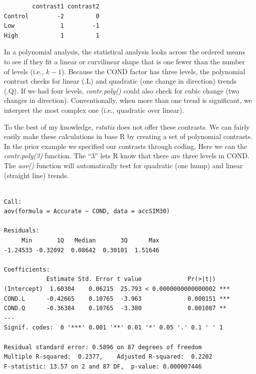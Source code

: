 \documentclass[
  11pt,
]{book}
\newenvironment{Shaded}{\begin{snugshade}}{\end{snugshade}}
\newcommand{\AttributeTok}[1]{\textcolor[rgb]{0.27,0.27,0.27}{#1}}
\newcommand{\DecValTok}[1]{\textcolor[rgb]{0.06,0.06,0.06}{#1}}
\newcommand{\FunctionTok}[1]{\textcolor[rgb]{0.27,0.27,0.27}{\textbf{#1}}}
\newcommand{\NormalTok}[1]{#1}
\newcommand{\OtherTok}[1]{\textcolor[rgb]{0.37,0.37,0.37}{#1}}
\newcommand{\SpecialCharTok}[1]{\textcolor[rgb]{0.43,0.43,0.43}{\textbf{#1}}}
\begin{document}
\begin{verbatim}
        contrast1 contrast2
Control        -2         0
Low             1        -1
High            1         1
\end{verbatim}

In a polynomial analysis, the statistical analysis looks across the ordered means to see if they fit a linear or curvilinear shape that is one fewer than the number of levels (i.e., \(k-1\)). Because the COND factor has three levels, the polynomial contrast checks for linear (.L) and quadratic (one change in direction) trends (.Q). If we had four levels, \emph{contr.poly()} could also check for cubic change (two changes in direction). Conventionally, when more than one trend is significant, we interpret the most complex one (i.e., quadratic over linear).

To the best of my knowledge, \emph{rstatix} does not offer these contrasts. We can fairly easily make these calculations in base R by creating a set of polynomial contrasts. In the prior example we specified our contrasts through coding. Here we can the \emph{contr.poly(3)} function. The ``3'' lets R know that there are three levels in COND. The \emph{aov()} function will automatically test for quadratic (one hump) and linear (straight line) trends.

\begin{Shaded}
\end{Shaded}

\begin{verbatim}

Call:
aov(formula = Accurate ~ COND, data = accSIM30)

Residuals:
     Min       1Q   Median       3Q      Max 
-1.24533 -0.32092  0.08642  0.30101  1.51646 

Coefficients:
            Estimate Std. Error t value             Pr(>|t|)    
(Intercept)  1.60304    0.06215  25.793 < 0.0000000000000002 ***
COND.L      -0.42665    0.10765  -3.963             0.000151 ***
COND.Q      -0.36384    0.10765  -3.380             0.001087 ** 
---
Signif. codes:  0 '***' 0.001 '**' 0.01 '*' 0.05 '.' 0.1 ' ' 1

Residual standard error: 0.5896 on 87 degrees of freedom
Multiple R-squared:  0.2377,    Adjusted R-squared:  0.2202 
F-statistic: 13.57 on 2 and 87 DF,  p-value: 0.000007446
\end{verbatim}
\end{document}
